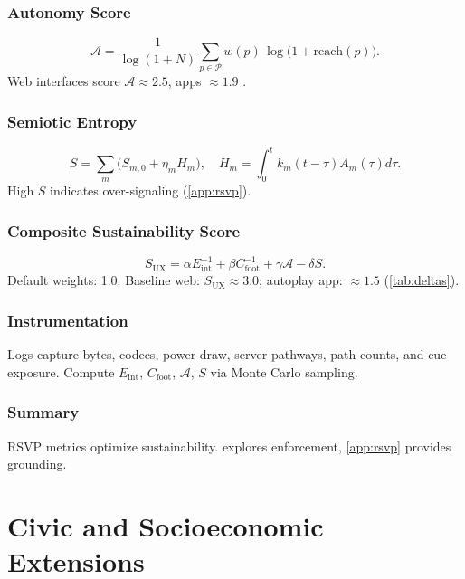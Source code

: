 \documentclass[openany]{book}
\newcommand{\Sent}{S} %
\newcommand{\Eint}{E_{\mathrm{int}}} %
\newcommand{\Cfoot}{C_{\mathrm{foot}}} %
\newcommand{\Auton}{\mathcal{A}} %
\newcommand{\SUX}{S_{\mathrm{UX}}} %
\begin{document}
{\section{Autonomy Score}
\label{sec:metrics-autonomy}
\begin{equation}
\label{eq:metrics-autonomy}
\Auton = \frac{1}{\log(1+N)}\sum_{p\in \mathcal{P}} w(p)\,\log\big(1+\mathrm{reach}(p)\big).
\end{equation}
Web interfaces score \(\Auton \approx 2.5\), apps \(\approx 1.9\) \citep{doctorow2022}.

\section{Semiotic Entropy}
\label{sec:metrics-entropy}
\begin{equation}
\label{eq:metrics-S}
\Sent = \sum_m \big(S_{m,0} + \eta_m H_m\big), \quad H_m = \int_0^t k_m(t-\tau) A_m(\tau) d\tau.
\end{equation}
High \(\Sent\) indicates over-signaling (\cref{app:rsvp}).

\section{Composite Sustainability Score}
\label{sec:metrics-composite}
\begin{equation}
\label{eq:metrics-SUX}
\SUX = \alpha \Eint^{-1} + \beta \Cfoot^{-1} + \gamma \Auton - \delta \Sent.
\end{equation}
Default weights: 1.0. Baseline web: \(\SUX \approx 3.0\); autoplay app: \(\approx 1.5\) (\cref{tab:deltas}).

\section{Instrumentation}
\label{sec:instrumentation}
Logs capture bytes, codecs, power draw, server pathways, path counts, and cue exposure. Compute \(\Eint\), \(\Cfoot\), \(\Auton\), \(\Sent\) via Monte Carlo sampling.

\section{Summary}
RSVP metrics optimize sustainability.  explores enforcement, \cref{app:rsvp} provides grounding.

\part{Civic and Socioeconomic Extensions}

}
\end{document}
